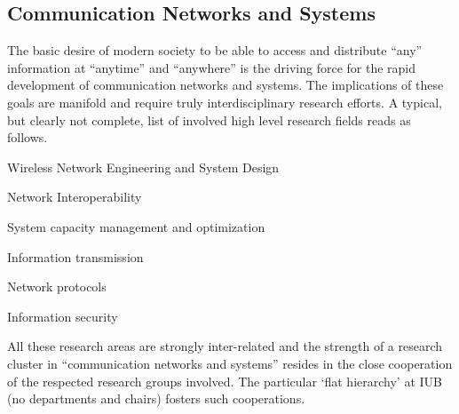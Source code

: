 \subsection{Communication Networks and Systems}

The basic desire of modern society to be able to access and
distribute ``any'' information at ``anytime'' and ``anywhere'' is
the driving force for the rapid development of communication
networks and systems. The implications of these goals are manifold
and require truly interdisciplinary research efforts. A typical, but
clearly not complete, list of involved high level research fields
reads as follows.

\begin{myitemize}
\item Wireless Network Engineering and System Design
\item Network Interoperability
\item System capacity management and optimization
\item Information transmission
\item Network protocols
\item Information security
\end{myitemize}

All these research areas are strongly inter-related and the strength
of a research cluster in ``communication networks and systems''
resides in the close cooperation of the respected research groups
involved. The particular `flat hierarchy' at IUB (no departments and
chairs) fosters such cooperations.

